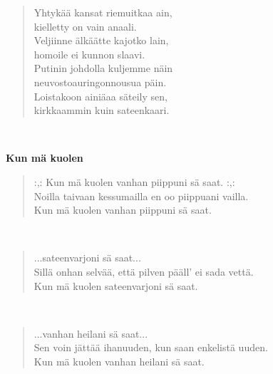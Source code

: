 \noindent\begin{minipage}{\linewidth}
\begin{verse}
	Yhtykää kansat riemuitkaa ain,\\
	kielletty on vain anaali.\\
	Veljiinne älkäätte kajotko lain,\\
	homoile ei kunnon slaavi.\\
	Putinin johdolla kuljemme näin\\
	neuvostoauringonnousua päin.\\
	Loistakoon ainiäaa säteily sen,\\
	kirkkaammin kuin sateenkaari.\\
\end{verse}
\end{minipage}\\[10pt]
%
%
\noindent\begin{minipage}{\linewidth}
\vspace{5pt}
\parbox[t]{0.85\linewidth}{\raggedright {\large\bf Kun mä kuolen}\\[6pt]}
\begin{verse}
	\hspace{0pt-\widthof{:,: }}:,: Kun mä kuolen vanhan piippuni sä saat. :,:\\
	Noilla taivaan kessumailla en oo piippuani vailla.\\
	Kun mä kuolen vanhan piippuni sä saat.\\
\end{verse}
\end{minipage}\\[10pt]
\noindent\begin{minipage}{\linewidth}
\begin{verse}
	...sateenvarjoni sä saat...\\
	Sillä onhan selvää, että pilven pääll' ei sada vettä.\\
	Kun mä kuolen sateenvarjoni sä saat.\\
\end{verse}
\end{minipage}\\[10pt]
\noindent\begin{minipage}{\linewidth}
\begin{verse}
	...vanhan heilani sä saat...\\
	Sen voin jättää ihanuuden, kun saan enkelistä uuden.\\
	Kun mä kuolen vanhan heilani sä saat.\\
\end{verse}
\end{minipage}\\[10pt]
